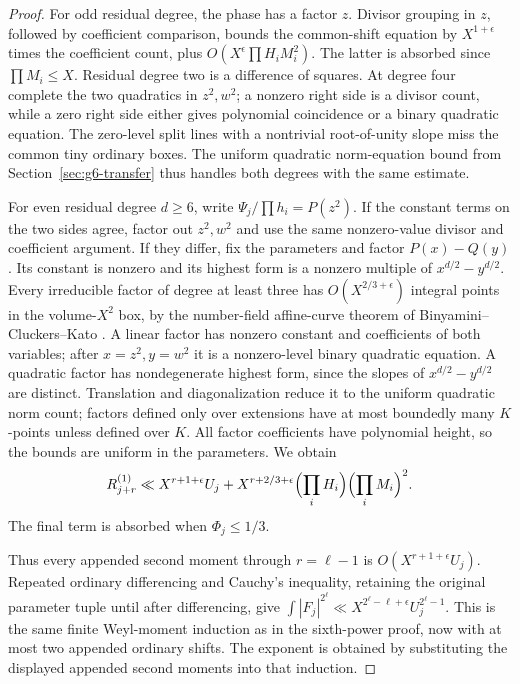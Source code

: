 \documentclass[11pt,reqno]{amsart}
\numberwithin{equation}{section}
\theoremstyle{definition}
\begin{document}
\begin{proof}
For odd residual degree, the phase has a factor $z$. Divisor grouping in
$z$, followed by coefficient comparison, bounds the common-shift equation
by $X^{1+\epsilon}$ times the coefficient count, plus
$O(X^\epsilon\prod H_iM_i^2)$. The latter is absorbed since
$\prod M_i\le X$. Residual degree two is a difference of squares.
At degree four complete the two quadratics in $z^2,w^2$; a nonzero right
side is a divisor count, while a zero right side either gives polynomial
coincidence or a binary quadratic equation. The zero-level split lines
with a nontrivial root-of-unity slope miss the common tiny ordinary boxes.
The uniform quadratic norm-equation bound from Section~\ref{sec:g6-transfer} thus
handles both degrees with the same estimate.

For even residual degree $d\ge6$, write $\Psi_j/\prod h_i=P(z^2)$.
If the constant terms on the two sides agree, factor out $z^2,w^2$ and
use the same nonzero-value divisor and coefficient argument. If they differ,
fix the parameters and factor $P(x)-Q(y)$. Its constant is nonzero and its
highest form is a nonzero multiple of $x^{d/2}-y^{d/2}$.
Every irreducible factor of degree at least three has
$O(X^{2/3+\epsilon})$ integral points in the volume-$X^2$ box, by the
number-field affine-curve theorem of Binyamini--Cluckers--Kato
\cite[Corollary~12]{BCK2025}.
A linear factor has nonzero constant and coefficients of both variables;
after $x=z^2,y=w^2$ it is a nonzero-level binary quadratic equation.
A quadratic factor has nondegenerate highest form, since the slopes of
$x^{d/2}-y^{d/2}$ are distinct. Translation and diagonalization reduce it
to the uniform quadratic norm count; factors defined only over extensions
have at most boundedly many $K$-points unless defined over $K$.
All factor coefficients have polynomial height, so the bounds are uniform
in the parameters. We obtain
\[
 R_{j+r}^{(1)}\ll X^{r+1+\epsilon}U_j
          +X^{r+2/3+\epsilon}\Bigl(\prod_iH_i\Bigr)
                                   \Bigl(\prod_iM_i\Bigr)^2.
\]
The final term is absorbed when $\Phi_j\le1/3$.

Thus every appended second moment through $r=\ell-1$ is
$O(X^{r+1+\epsilon}U_j)$. Repeated ordinary differencing and Cauchy's
inequality, retaining the original parameter tuple until after differencing,
give
$\int|F_j|^{2^\ell}\ll X^{2^\ell-\ell+\epsilon}U_j^{2^\ell-1}$.
This is the same finite Weyl-moment induction as in the sixth-power proof,
now with at most two appended ordinary shifts. The exponent is obtained
by substituting the displayed appended second moments into that induction.
\end{proof}
\end{document}
